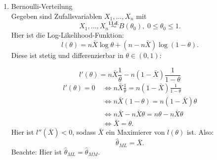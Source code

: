 \documentclass[10pt]{article}
\newcommand{\FZV}{X_1, \ldots, X_n} %
\newenvironment{BSP}[1][]
{\begin{Beispiel}[frametitle=#1]}{\end{Beispiel}}
\begin{document}
	\begin{BSP}[Beispiel 1.3.8 (Maximum-Likelihood)]
		\begin{enumerate}[label = (\roman*)]
			\item Bernoulli-Verteilung \\
			Gegeben sind Zufallsvariablen $\FZV$ mit
			\begin{equation*}
				\FZV \overset{\textbf{i.i.d.}}{\sim} B(\theta_0), \; 0 \leq \theta_0 \leq 1.
			\end{equation*} 
			Hier ist die Log-Likelihood-Funktion:
			\begin{equation*}
				l(\theta)=n\bar{X}\log\theta + (n-n\bar{X})\log(1-\theta).
			\end{equation*}
			Diese ist stetig und differenzierbar in $\theta \in (0,1)$:
			
			\begin{equation*}
				l'(\theta) = n\bar{X}\frac{1}{\theta} - n (1-\bar{X}) \frac{1}{1-\theta}
			\end{equation*}
			\begin{equation*}
				\begin{split}
					l'(\theta) = 0 \; &\Leftrightarrow n\bar{X}\frac{1}{\theta} = n(1-\bar{X})\frac{1}{1-\theta} \\&\Leftrightarrow n\bar{X}(1-\theta) = n(1-\bar{X})\theta\\ &\Leftrightarrow n \bar{X}-n\bar{X}\theta = n\theta-n\bar{X}\theta \\&\Leftrightarrow \bar{X} = \theta.
				\end{split}
			\end{equation*}
			Hier ist  $l''(\bar{X})<0$, sodass $\bar{X}$ ein Maximierer von $l(\theta)$ ist. Also:
			\begin{equation*}
				\hat{\theta}_{ML} = \bar{X}.
			\end{equation*}
			Beachte: Hier ist $\hat{\theta}_{ML} = \hat{\theta}_{MM}$.
			

\end{enumerate}
\end{BSP}
\end{document}
